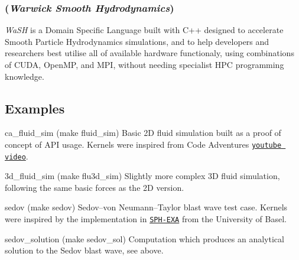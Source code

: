  

\subsubsection*{({\itshape {\bfseries Wa}rwick {\bfseries S}mooth {\bfseries H}ydrodynamics})}

{\itshape Wa\+SH} is a Domain Specific Language built with C++ designed to accelerate Smooth Particle Hydrodynamics simulations, and to help developers and researchers best utilise all of available hardware functionaly, using combinations of C\+U\+DA, Open\+MP, and M\+PI, without needing specialist H\+PC programming knowledge.

\subsection*{Examples}


\begin{DoxyItemize}
\item {\ttfamily ca\+\_\+fluid\+\_\+sim} ({\ttfamily make fluid\+\_\+sim}) Basic 2D fluid simulation built as a proof of concept of A\+PI usage. Kernels were inspired from Code Adventures \href{https://www.youtube.com/watch?v=rSKMYc1CQHE}{\tt youtube video}.
\item {\ttfamily 3d\+\_\+fluid\+\_\+sim} ({\ttfamily make flu3d\+\_\+sim}) Slightly more complex 3D fluid simulation, following the same basic forces as the 2D version.
\item {\ttfamily sedov} ({\ttfamily make sedov}) Sedov–von Neumann–\+Taylor blast wave test case. Kernels were inspired by the implementation in \href{https://github.com/unibas-dmi-hpc/SPH-EXA}{\tt S\+P\+H-\/\+E\+XA} from the University of Basel.
\item {\ttfamily sedov\+\_\+solution} ({\ttfamily make sedov\+\_\+sol}) Computation which produces an analytical solution to the Sedov blast wave, see above. 
\end{DoxyItemize}